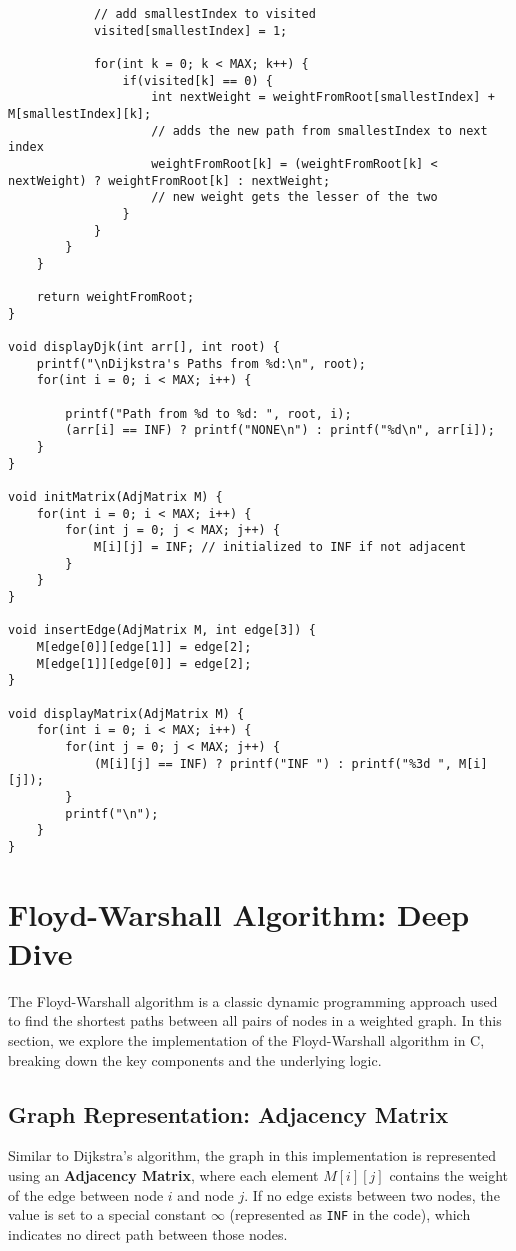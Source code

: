 \documentclass{book}
\begin{document}
\begin{verbatim}
            // add smallestIndex to visited
            visited[smallestIndex] = 1;

            for(int k = 0; k < MAX; k++) {
                if(visited[k] == 0) {
                    int nextWeight = weightFromRoot[smallestIndex] + M[smallestIndex][k]; 
                    // adds the new path from smallestIndex to next index
                    weightFromRoot[k] = (weightFromRoot[k] < nextWeight) ? weightFromRoot[k] : nextWeight;
                    // new weight gets the lesser of the two
                }
            }
        }
    }

    return weightFromRoot;
}

void displayDjk(int arr[], int root) {
    printf("\nDijkstra's Paths from %d:\n", root);
    for(int i = 0; i < MAX; i++) {
        
        printf("Path from %d to %d: ", root, i);
        (arr[i] == INF) ? printf("NONE\n") : printf("%d\n", arr[i]);
    }
}

void initMatrix(AdjMatrix M) {
    for(int i = 0; i < MAX; i++) {
        for(int j = 0; j < MAX; j++) {
            M[i][j] = INF; // initialized to INF if not adjacent
        }
    }
}

void insertEdge(AdjMatrix M, int edge[3]) {
    M[edge[0]][edge[1]] = edge[2];
    M[edge[1]][edge[0]] = edge[2];
}

void displayMatrix(AdjMatrix M) {
    for(int i = 0; i < MAX; i++) {
        for(int j = 0; j < MAX; j++) {
            (M[i][j] == INF) ? printf("INF ") : printf("%3d ", M[i][j]);
        }
        printf("\n");
    }
}
\end{verbatim}
\twocolumn
\section{Floyd-Warshall Algorithm: Deep Dive}

The Floyd-Warshall algorithm is a classic dynamic programming approach used to find the shortest paths between all pairs of nodes in a weighted graph. In this section, we explore the implementation of the Floyd-Warshall algorithm in C, breaking down the key components and the underlying logic.

\subsection{Graph Representation: Adjacency Matrix}

Similar to Dijkstra’s algorithm, the graph in this implementation is represented using an \textbf{Adjacency Matrix}, where each element \( M[i][j] \) contains the weight of the edge between node \( i \) and node \( j \). If no edge exists between two nodes, the value is set to a special constant \(\infty\) (represented as \texttt{INF} in the code), which indicates no direct path between those nodes. 
\end{document}
